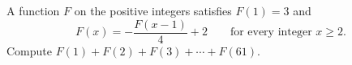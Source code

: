 A function $F$ on the positive integers satisfies $F(1)=3$ and
\[
F(x)=-\dfrac{F(x-1)}{4}+2\qquad\text{for every integer }x\ge2 .
\]
Compute $F(1)+F(2)+F(3)+\cdots+F(61)$.
